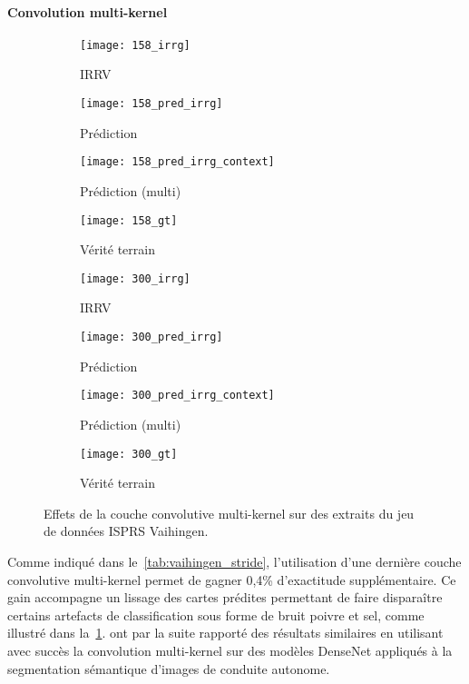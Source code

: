 \paragraph{Convolution multi-kernel}
\begin{figure}[h]
  \captionsetup[subfigure]{singlelinecheck=off,justification=centering}
  \captionsetup[subfigure]{labelformat=empty}
  \begin{subfigure}[t]{0.125\textwidth}
    \texttt{[image: 158\_irrg]}
    \caption{\gls{IRRV}}
  \end{subfigure}%
  \begin{subfigure}[t]{0.125\textwidth}
    \texttt{[image: 158\_pred\_irrg]}
    \caption{Prédiction}
  \end{subfigure}%
  \begin{subfigure}[t]{0.125\textwidth}
    \texttt{[image: 158\_pred\_irrg\_context]}
    \caption{Prédiction (multi)}
  \end{subfigure}%
  \begin{subfigure}[t]{0.125\textwidth}
    \texttt{[image: 158\_gt]}
    \caption{Vérité terrain}
  \end{subfigure}%
	\begin{subfigure}[t]{0.125\textwidth}
		\texttt{[image: 300\_irrg]}
		\caption{\gls{IRRV}}
	\end{subfigure}%
	\begin{subfigure}[t]{0.125\textwidth}
		\texttt{[image: 300\_pred\_irrg]}
		\caption{Prédiction}
	\end{subfigure}%
	\begin{subfigure}[t]{0.125\textwidth}
		\texttt{[image: 300\_pred\_irrg\_context]}
		\caption{Prédiction (multi)}
	\end{subfigure}%
	\begin{subfigure}[t]{0.125\textwidth}
		\texttt{[image: 300\_gt]}
		\caption{Vérité terrain}
	\end{subfigure}
  \caption{Effets de la couche convolutive multi-kernel sur des extraits du jeu de données \gls{ISPRS} Vaihingen.\\
	\isprslegende}
  \label{fig:patches_context}
\end{figure}

Comme indiqué dans le~\cref{tab:vaihingen_stride}, l'utilisation d'une dernière couche convolutive multi-kernel permet de gagner 0,4\% d'exactitude supplémentaire. Ce gain accompagne un lissage des cartes prédites permettant de faire disparaître certains artefacts de classification sous forme de bruit poivre et sel, comme illustré dans la~\cref{fig:patches_context}.
\citet{brahimi_multiscale_2018} ont par la suite rapporté des résultats similaires en utilisant avec succès la convolution multi-kernel sur des modèles DenseNet appliqués à la segmentation sémantique d'images de conduite autonome.

